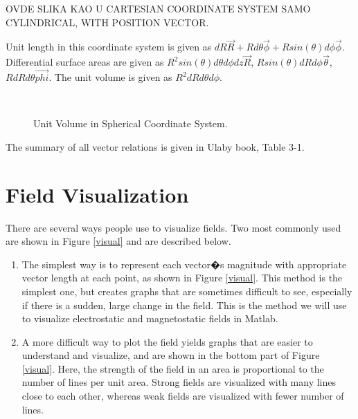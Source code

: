 \begin{description}
OVDE SLIKA KAO U CARTESIAN COORDINATE SYSTEM SAMO CYLINDRICAL, WITH POSITION VECTOR.




Unit length in this coordinate system is given as $dR \vec{R} + R d\theta \vec{\phi} + R sin(\theta)d\phi \vec{\phi}$. Differential surface areas are given as $R^2 sin(\theta) d\theta d\phi dz \vec{R}$, $R sin(\theta)dR d\phi \vec{\theta}$, $R dR d\theta \vec{phi}$. The unit volume is given as $R^2 dR d\theta  d\phi$.


\begin{figure}[htbp]
\begin{center}
\strut{} \\
\end{center}
\caption{Unit Volume in Spherical Coordinate System.}
\label{sphersyst}
\end{figure}




The summary of all vector relations is given in Ulaby book, Table 3-1.



\end{description}

\section{Field Visualization}
There are several ways people use to visualize fields. Two most commonly used are shown in Figure \ref{visual} and are described below.
\begin{enumerate}
\item The simplest way is to represent each vector�s magnitude with appropriate vector length at each point, as shown in Figure \ref{visual}. This method is the simplest one, but creates graphs that are sometimes difficult to see, especially if there is a sudden, large change in the field.  This is the method we will use to visualize electrostatic and magnetostatic fields in Matlab.
\item A more difficult way to plot the field yields graphs that are easier to understand and visualize, and are shown in the bottom part of Figure \ref{visual}. Here, the strength of the field in an area is proportional to the number of lines per unit area. Strong fields are visualized with many lines close to each other, whereas weak fields are visualized with fewer number of lines. 
\end{enumerate}

